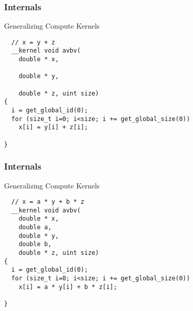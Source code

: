 % 
% 
% 
% 
% 
% 
% 



\begin{frame}[fragile]
\frametitle{Internals}

 \begin{block}{Generalizing Compute Kernels}
  \begin{lstlisting}
  // x = y + z
  __kernel void avbv(
    double * x,

    double * y,

    double * z, uint size)
{
  i = get_global_id(0);
  for (size_t i=0; i<size; i += get_global_size(0))
    x[i] = y[i] + z[i]; 

}
  \end{lstlisting}
 \end{block}

 \vspace*{1.5cm}
\end{frame}



\begin{frame}[fragile]
\frametitle{Internals}

 \begin{block}{Generalizing Compute Kernels}
  \begin{lstlisting}
  // x = a * y + b * z
  __kernel void avbv(
    double * x,
    double a,
    double * y,
    double b,
    double * z, uint size)
{
  i = get_global_id(0);
  for (size_t i=0; i<size; i += get_global_size(0))
    x[i] = a * y[i] + b * z[i]; 

}
  \end{lstlisting}
 \end{block}

 \vspace*{1.5cm}
\end{frame}


